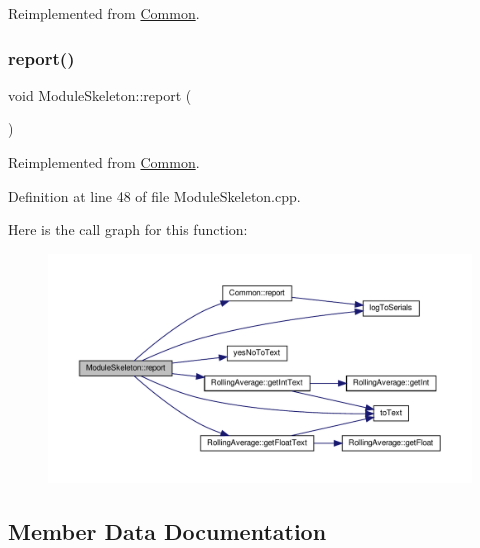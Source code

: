 Reimplemented from \hyperlink{class_common_a9e60e2c26a5f4d72342a59a969954636}{Common}.

\mbox{\label{class_module_skeleton_a4b13bbc3ce0282781e36f450bd4f189a}} 
\subsubsection{\texorpdfstring{report()}{report()}\hspace{0.1cm}{\footnotesize\ttfamily [2/2]}}
{\footnotesize\ttfamily void Module\+Skeleton\+::report (\begin{DoxyParamCaption}{ }\end{DoxyParamCaption})\hspace{0.3cm}{\ttfamily [virtual]}}



Reimplemented from \hyperlink{class_common_a9e60e2c26a5f4d72342a59a969954636}{Common}.



Definition at line 48 of file Module\+Skeleton.\+cpp.

Here is the call graph for this function\+:
\nopagebreak
\begin{figure}[H]
\begin{center}
\leavevmode
\includegraphics[width=350pt]{class_module_skeleton_a4b13bbc3ce0282781e36f450bd4f189a_cgraph}
\end{center}
\end{figure}


\subsection{Member Data Documentation}
\mbox{\label{class_module_skeleton_a19e516bf8a16be02bb3b41c457a215bd}} 
